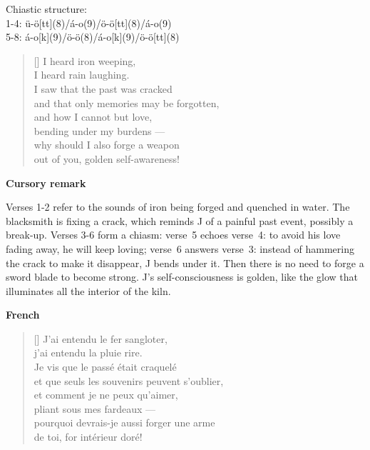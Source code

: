 \documentclass[a4paper,12pt,twoside,final]{book}
\begin{document}
\noindent Chiastic structure: \\
1-4: ü-ö[tt](8)/á-o(9)/ö-ö[tt](8)/á-o(9) \\
5-8: á-o[k](9)/ö-ö(8)/á-o[k](9)/ö-ö[tt](8)

\newpage


\settowidth{\versewidth}{and that only a memory may be forgotten;}

\begin{verse}[\versewidth]
  I heard iron weeping, \\
  I heard rain laughing. \\
  I saw that the past was cracked \\
  and that only memories may be forgotten, \\
  and how I cannot but love, \\
  bending under my burdens --- \\
  why should I also forge a weapon \\
  out of you, golden self-awareness! \\
\end{verse}

\bigskip

\noindent \textbf{Cursory remark}

\medskip

Verses 1-2 refer to the sounds of iron being forged and quenched in
water. The blacksmith is fixing a crack, which reminds J of a painful
past event, possibly a break\hyp{}up. Verses 3-6 form a chiasm:
verse~5 echoes verse~4: to avoid his love fading away, he will keep
loving; verse~6 answers verse~3: instead of hammering the crack to
make it disappear, J bends under it. Then there is no need to forge a
sword blade to become strong. J's self\hyp{}consciousness is golden,
like the glow that illuminates all the interior of the kiln.

\bigskip

\noindent \textbf{French}


\settowidth{\versewidth}{et que seuls les souvenirs peuvent s'oublier,}

\begin{verse}[\versewidth]
  J'ai entendu le fer sangloter, \\
  j'ai entendu la pluie rire. \\
  Je vis que le passé était craquelé \\
  et que seuls les souvenirs peuvent s'oublier, \\
  et comment je ne peux qu'aimer, \\
  pliant sous mes fardeaux --- \\
  pourquoi devrais-je aussi forger une arme \\
  de toi, for intérieur doré! \\
\end{verse}
\end{document}
